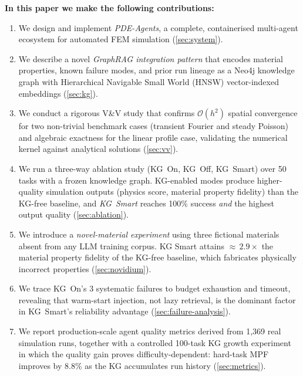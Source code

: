 \documentclass[preprint,review,12pt]{elsarticle}
\begin{document}
\textbf{In this paper we make the following contributions:}
\begin{enumerate}
  \item We design and implement \textit{PDE-Agents}, a complete, containerised
        multi-agent ecosystem for automated FEM simulation
        (\cref{sec:system}).
  \item We describe a novel \emph{GraphRAG integration pattern} that encodes
        material properties, known failure modes, and prior run lineage as a
        Neo4j knowledge graph with Hierarchical Navigable Small World
        (HNSW) vector-indexed embeddings \citep{malkov2020hnsw}
        (\cref{sec:kg}).
  \item We conduct a rigorous V\&V study that confirms $\mathcal{O}(h^2)$
        spatial convergence for two non-trivial benchmark cases
        (transient Fourier and steady Poisson) and algebraic exactness
        for the linear profile case, validating
        the numerical kernel against analytical solutions
        (\cref{sec:vv}).
  \item We run a three-way ablation study (KG~On, KG~Off, KG~Smart)
        over 50 tasks with a frozen knowledge graph.  KG-enabled modes
        produce higher-quality simulation outputs (physics score,
        material property fidelity) than the KG-free baseline, and
        \emph{KG~Smart} reaches 100\% success \emph{and} the highest
        output quality (\cref{sec:ablation}).
  \item We introduce a \emph{novel-material experiment} using three
        fictional materials absent from any LLM training corpus.
        KG Smart attains ${\approx}\,2.9\times$ the material property
        fidelity of the KG-free baseline, which fabricates physically
        incorrect properties (\cref{sec:novidium}).
  \item We trace KG~On's 3 systematic failures to budget exhaustion
        and timeout, revealing that warm-start injection, not lazy
        retrieval, is the dominant factor in KG~Smart's reliability
        advantage (\cref{sec:failure-analysis}).
  \item We report production-scale agent quality metrics derived from
        1{,}369 real simulation runs, together with a controlled
        100-task KG growth experiment in which the quality gain proves
        difficulty-dependent: hard-task MPF improves by 8.8\% as the KG
        accumulates run history (\cref{sec:metrics}).
\end{enumerate}
\end{document}
